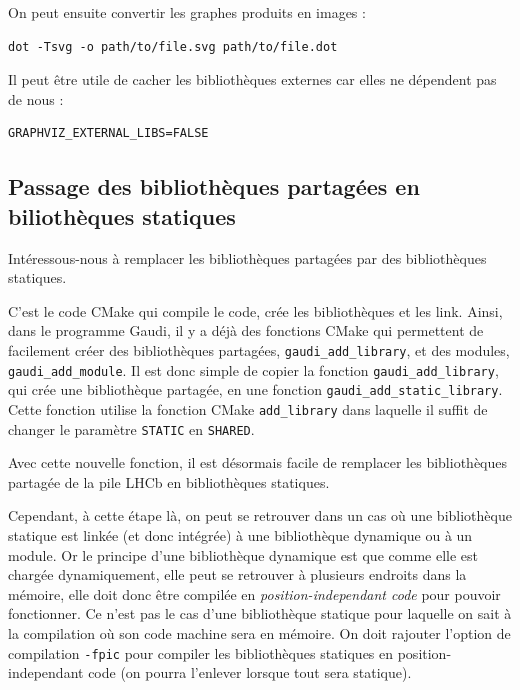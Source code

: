 \documentclass[a4paper]{report}
\begin{document}
            On peut ensuite convertir les graphes produits en images :
            \begin{verbatim}
dot -Tsvg -o path/to/file.svg path/to/file.dot
            \end{verbatim}

            Il peut être utile de cacher les bibliothèques externes car elles ne dépendent pas de nous :
            \begin{verbatim}
GRAPHVIZ_EXTERNAL_LIBS=FALSE
            \end{verbatim}

        \subsection{Passage des bibliothèques partagées en biliothèques statiques}
            Intéressous-nous à remplacer les bibliothèques partagées par des bibliothèques statiques.

            C'est le code CMake qui compile le code, crée les bibliothèques et les link.
            Ainsi, dans le programme Gaudi, il y a déjà des fonctions CMake qui permettent de facilement créer des bibliothèques partagées, \verb'gaudi_add_library', et des modules, \verb'gaudi_add_module'.
            Il est donc simple de copier la fonction \verb'gaudi_add_library', qui crée une bibliothèque partagée, en une fonction \verb'gaudi_add_static_library'.
            Cette fonction utilise la fonction CMake \verb'add_library' dans laquelle il suffit de changer le paramètre \verb'STATIC' en \verb'SHARED'.

            Avec cette nouvelle fonction, il est désormais facile de remplacer les bibliothèques partagée de la pile LHCb en bibliothèques statiques.

            Cependant, à cette étape là, on peut se retrouver dans un cas où une bibliothèque statique est linkée (et donc intégrée) à une bibliothèque dynamique ou à un module.
            Or le principe d'une bibliothèque dynamique est que comme elle est chargée dynamiquement, elle peut se retrouver à plusieurs endroits dans la mémoire, elle doit donc être compilée en \emph{position-independant code} pour pouvoir fonctionner.
            Ce n'est pas le cas d'une bibliothèque statique pour laquelle on sait à la compilation où son code machine sera en mémoire.
            On doit rajouter l'option de compilation \verb'-fpic' pour compiler les bibliothèques statiques en position-independant code (on pourra l'enlever lorsque tout sera statique).
\end{document}
